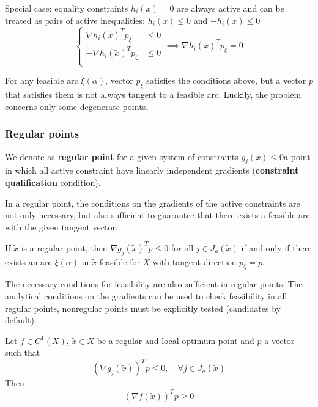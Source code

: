 Special case: equality constraints $h_i (x) = 0$ are always active and can be treated as pairs of active inequalities: $h_i (x) \leq 0$ and $-h_i (x) \leq 0$
$$
\begin{cases}
	\nabla h_i (\tilde x)^T p_\xi & \leq 0 \\
	- \nabla h_i (\tilde x)^T p_\xi & \leq 0 \\
\end{cases}
\implies \nabla h_i (\tilde x)^T p_\xi = 0
$$

For any feasible arc $\xi (\alpha)$, vector $p_\xi$ satisfies the conditions above, but a vector $p$ that satisfies them is not always tangent to a feasible arc. Luckily, the problem concerns only some degenerate points.

\subsubsection{Regular points}

\begin{definition}
	We denote as \textbf{regular point} for a given system of constraints $g_j (x) \leq 0$a point in which all active constraint have linearly independent gradients (\textbf{constraint qualification} condition).
\end{definition}

In a regular point, the conditions on the gradients of the active constraints are not only necessary, but also sufficient to guarantee that there exists a feasible arc with the given tangent vector. \\

\begin{theo}
	If $\tilde x$ is a regular point, then $\nabla g_j (\tilde x)^T p \leq 0$ for all $j \in J_a (\tilde x)$ if and only if there exists an arc $\xi (\alpha)$ in $\tilde x$ feasible for $X$ with tangent direction $p_\xi = p$.
\end{theo}

The necessary conditions for feasibility are also sufficient in regular points. The analytical conditions on the gradients can be used to check feasibility in all regular points, nonregular points must be explicitly tested (candidates by default). \\

\begin{coro}
	Let $f \in C^1 (X)$, $\tilde x \in X$ be a regular and local optimum point and $p$ a vector such that
	$$ (\nabla g_j (\tilde x))^T p \leq 0, \quad \forall j \in J_a (\tilde x) $$
	Then 
	$$ (\nabla f(\tilde x))^T p \geq 0 $$
\end{coro}

